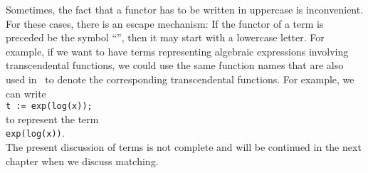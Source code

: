 Sometimes, the fact that a functor has to be written in uppercase is inconvenient.  For these cases,
there is an escape mechanism:  If the functor of a term is preceded be the symbol
``\texttt{}'', then it may start with a lowercase letter.  For example, if we want to
have terms representing algebraic expressions involving transcendental functions, we could use the
same function names that are also used in \setlx\ to denote the corresponding transcendental
functions.  For example, we can write
\\[0.2cm]
\hspace*{1.3cm}
\texttt{t := exp(log(x));}
\\[0.2cm]
to represent the term
\\[0.2cm]
\hspace*{1.3cm}
\texttt{exp(log(x))}.
\\[0.2cm]
The present discussion of terms is not complete and will be continued in the next chapter when we
discuss matching.

